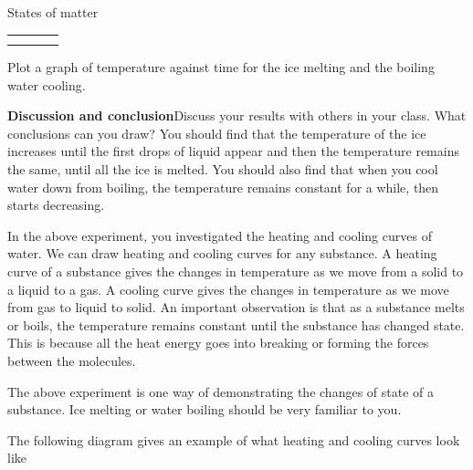 \begin{fexperiment}{States of matter}
{\begin{table}[H]
\begin{center}
\begin{xtabular}[t]{|l|l|l|l|}
         &
         &
         &
     \tabularnewline{}
         &
         &
         &
     \tabularnewline{}
    \end{xtabular}
      \end{center}
\end{table}
    \par
Plot a graph of temperature against time for the ice melting and the boiling water cooling. 
\par 
\label{m38736*eip-864}\noindent{}\textbf{Discussion and conclusion}Discuss your results with others in your class. What conclusions can you draw? You should find that the temperature of the ice increases until the first drops of liquid appear and then the temperature remains the same, until all the ice is melted. You should also find that when you cool water down from boiling, the temperature remains constant for a while, then starts decreasing.} 
\par \label{m38736*eip-25}In the above experiment, you investigated the heating and cooling curves of water. We can draw heating and cooling curves for any substance. A heating curve of a substance gives the changes in temperature as we move from a solid to a liquid to a gas. A cooling curve gives the changes in temperature as we move from gas to liquid to solid. An important observation is that as a substance melts or boils, the temperature remains constant until the substance has changed state. This is because all the heat energy goes into breaking or forming the forces between the molecules. \par \label{m38736*eip-166}The above experiment is one way of demonstrating the changes of state of a substance. Ice melting or water boiling should be very familiar to you. \par 
The following diagram gives an example of what heating and cooling curves look like \par
\begin{minipage}{0.5\textwidth}
\begin{figure}[H]
 \begin{center}
\end{center}
\end{figure}
\end{minipage}
\end{fexperiment}
